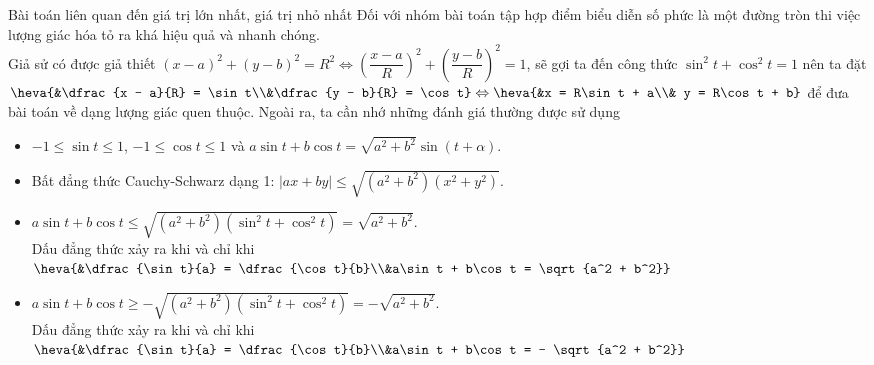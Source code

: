\begin{dang}{Bài toán liên quan đến giá trị lớn nhất, giá trị nhỏ nhất}
	Đối với nhóm bài toán tập hợp điểm biểu diễn số phức là một đường tròn thi việc lượng giác hóa tỏ ra khá hiệu quả và nhanh chóng.\\
	Giả sử có được giả thiết $\left(x - a\right)^2 + \left(y - b\right)^2 = R^2\Leftrightarrow \left(\dfrac{x - a}{R}\right)^2  + \left(\dfrac{y - b}{R}\right)^2 = 1$, sẽ gợi ta đến công thức $\sin^2t + \cos^2t = 1$ nên ta đặt $\heva{&\dfrac{x - a}{R} = \sin t\\&\dfrac{y - b}{R} = \cos t}\Leftrightarrow \heva{&x = R\sin t + a\\& y = R\cos t + b}$ để đưa bài toán về dạng lượng giác quen thuộc. Ngoài ra, ta cần nhớ những đánh giá thường được sử dụng
	\begin{note}
		\begin{itemize}  
			\item $- 1\leq \sin t\leq 1$, $- 1\leq \cos t\leq 1$ và $a\sin t + b\cos t = \sqrt{a^2 + b^2}\sin\left(t + \alpha\right)$.
			\item Bất đẳng  thức Cauchy-Schwarz dạng 1: $\left\vert ax + by\right\vert\leq \sqrt{\left(a^2 + b^2\right)\left(x^2 + y^2\right)}$.
			\item  $a\sin t + b\cos t\leq \sqrt{\left(a^2 + b^2\right)\left(\sin^2t + \cos^2t\right)} = \sqrt{a^2 + b^2}$.\\
			Dấu đẳng thức xảy ra khi và chỉ khi $\heva{&\dfrac{\sin t}{a} = \dfrac{\cos t}{b}\\&a\sin t + b\cos t = \sqrt{a^2 + b^2}}$ 
			\item $a\sin t + b\cos t\geq - \sqrt{\left(a^2 + b^2\right)\left(\sin^2t + \cos^2t\right)} = - \sqrt{a^2 + b^2}$.\\
			Dấu đẳng thức xảy ra khi và chỉ khi $\heva{&\dfrac{\sin t}{a} = \dfrac{\cos t}{b}\\&a\sin t + b\cos t = - \sqrt{a^2 + b^2}}$ 
		\end{itemize}
	\end{note}
\end{dang}

